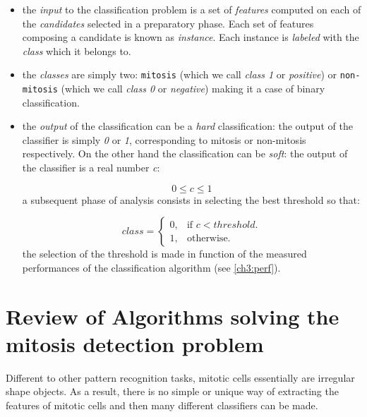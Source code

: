 \begin{itemize}
\item the \textit{input} to the classification problem is a set of \textit{features} computed on each of the \textit{candidates} selected in a preparatory phase.
    Each set of features composing a candidate is known as \textit{instance}. Each instance is \textit{labeled}  with the \textit{class} which it belongs to.
\item the \textit{classes} are simply two: \texttt{mitosis} (which we call \textit{class 1} or \textit{positive})
    or \texttt{non-mitosis} (which we call \textit{class 0} or \textit{negative}) making it a case of binary classification.
\item the \textit{output} of the classification can be a \textit{hard} classification: the output of the classifier is simply \textit{0} or \textit{1},
    corresponding to mitosis or non-mitosis respectively. On the other hand the classification can be \textit{soft}: the output of the classifier is a real number \textit{c}:

\begin{equation}
 0 \leq c \leq 1
\end{equation}
a subsequent phase of analysis consists in selecting the best threshold so that:

\begin{equation}
   \textit{class}=\begin{cases}
    0, & \text{if $c<threshold$}.\\
    1, & \text{otherwise}.
  \end{cases}
\end{equation}
the selection of the threshold is made in function of the measured performances of the classification algorithm (see \ref{ch3:perf}).

\end{itemize}

\vspace{0.5cm}

\section{Review of Algorithms solving the mitosis detection problem}
\label{ch3:review}

Different to other pattern recognition tasks, mitotic cells essentially are irregular shape objects. As a result, there
is no simple or unique way of extracting the features of mitotic cells and then many different classifiers can be made.

